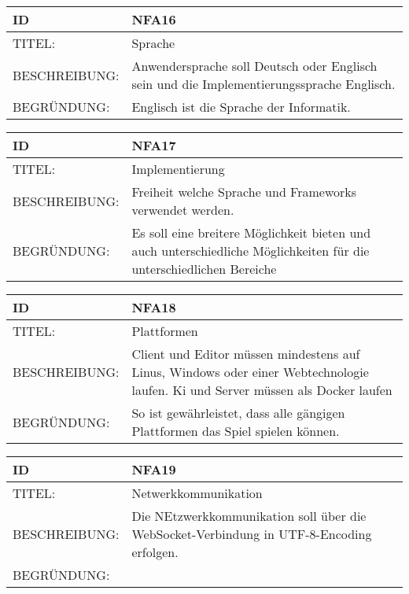 \documentclass{uulm-assignment}
\begin{document}
     \begin{tabularx}{\textwidth}{|l|X |} \hline
        \textbf{ID} & \textbf{NFA16} \\
        \hline
        TITEL: &  Sprache\\
        \hline
        BESCHREIBUNG: &  Anwendersprache soll Deutsch oder Englisch sein und die Implementierungssprache Englisch.\\
        \hline
        BEGRÜNDUNG: &  Englisch ist die Sprache der Informatik.\\
        \hline
    \end{tabularx}

    \begin{tabularx}{\textwidth}{|l|X |} \hline
        \textbf{ID} & \textbf{NFA17} \\
        \hline
        TITEL: &  Implementierung\\
        \hline
        BESCHREIBUNG: &  Freiheit welche Sprache und Frameworks verwendet werden. \\
        \hline
        BEGRÜNDUNG: &  Es soll eine breitere Möglichkeit bieten und auch unterschiedliche Möglichkeiten für die unterschiedlichen Bereiche\\
        \hline
    \end{tabularx}

    \begin{tabularx}{\textwidth}{|l|X |} \hline
        \textbf{ID} & \textbf{NFA18} \\
        \hline
        TITEL: &  Plattformen\\
        \hline
        BESCHREIBUNG: &  Client und Editor müssen mindestens auf Linus, Windows oder einer Webtechnologie laufen.
        Ki und Server müssen als Docker laufen\\
        \hline
        BEGRÜNDUNG: &  So ist gewährleistet, dass alle gängigen Plattformen das Spiel spielen können.\\
        \hline
    \end{tabularx}

    \begin{tabularx}{\textwidth}{|l|X |} \hline
        \textbf{ID} & \textbf{NFA19} \\
        \hline
        TITEL: &  Netwerkkommunikation\\
        \hline
        BESCHREIBUNG: &  Die NEtzwerkkommunikation  soll über die WebSocket-Verbindung in UTF-8-Encoding erfolgen.\\
        \hline
        BEGRÜNDUNG: &  \\
        \hline
    \end{tabularx}
\end{document}

